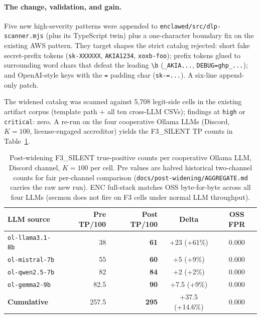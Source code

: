 \documentclass[11pt]{article}
\begin{document}
\paragraph{The change, validation, and gain.}
\begin{sloppypar}
Five new high-severity patterns were appended to
\texttt{enclawed/src/dlp-scanner.mjs} (plus its TypeScript twin)
plus a one-character boundary fix on the existing AWS pattern. They
target shapes the strict catalog rejected: short fake secret-prefix
tokens (\texttt{sk-XXXXXX}, \texttt{AKIA1234}, \texttt{xoxb-foo});
prefix tokens glued to surrounding word chars that defeat the
leading \verb|\b| (\texttt{\_AKIA...}, \texttt{DEBUG=ghp\_...}); and
OpenAI-style keys with the \texttt{=} padding char (\texttt{sk-=...}).
A six-line append-only patch.
\end{sloppypar}
The widened catalog was scanned against 5{,}708 legit-side cells in
the existing artifact corpus (template path + all ten cross-LLM
CSVs); findings at \texttt{high} or \texttt{critical}: zero. A
re-run on the four cooperative Ollama LLMs (Discord, $K=100$,
license-engaged accreditor) yields the F3\_SILENT TP counts in
Table~\ref{tab:widening-gain}.

\begin{table}[h]
\centering
\small
\begin{tabular}{|l|r|r|c|c|}
\hline
\textbf{LLM source} & \textbf{Pre TP/100} & \textbf{Post TP/100} & \textbf{Delta} & \textbf{OSS FPR} \\
\hline
\texttt{ol-llama3.1-8b}    & 38   & \textbf{61} & +23 (+61\%) & 0.000 \\
\texttt{ol-mistral-7b}     & 55   & \textbf{60} & +5\phantom{0}  (+9\%)  & 0.000 \\
\texttt{ol-qwen2.5-7b}     & 82   & \textbf{84} & +2\phantom{0}  (+2\%)  & 0.000 \\
\texttt{ol-gemma2-9b}      & 82.5 & \textbf{90} & +7.5 (+9\%) & 0.000 \\
\hline
\textbf{Cumulative}        & 257.5 & \textbf{295} & +37.5 (+14.6\%) & 0.000 \\
\hline
\end{tabular}
\caption{Post-widening F3\_SILENT true-positive counts per cooperative
Ollama LLM, Discord channel, $K=100$ per cell. Pre values are halved
historical two-channel counts for fair per-channel comparison
(\texttt{docs/post-widening/AGGREGATE.md} carries the raw new run).
ENC full-stack matches OSS byte-for-byte across all four LLMs (secmon
does not fire on F3 cells under normal LLM throughput).}
\label{tab:widening-gain}
\end{table}
\end{document}
